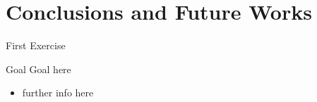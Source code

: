 \documentclass[presentation]{beamer}\mode<presentation>{\usetheme{AMSBolognaFC}}
\begin{document}
\section{Conclusions and Future Works}

\begin{frame}{First Exercise}
    \begin{block}{Goal}
        Goal here
    \end{block}
    \begin{itemize}
        \item further info here
    \end{itemize}
\end{frame}

\section*{}

\frame{\titlepage}

\section*{\refname}

\begin{frame}{\refname}
    \scriptsize
    
    
\end{frame}

\end{document}
